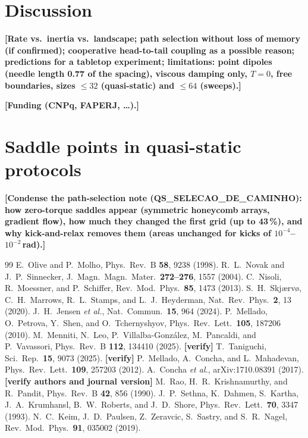 \documentclass[pre,twocolumn,superscriptaddress,showpacs,floatfix]{revtex4-2}
\newcommand{\todo}[1]{\textcolor{red!70!black}{\textbf{[#1]}}}
\begin{document}
\section{Discussion}
\label{sec:discussion}
\todo{Rate vs.\ inertia vs.\ landscape; path selection without loss of memory (if confirmed); cooperative head-to-tail coupling as a possible reason; predictions for a tabletop experiment; limitations: point dipoles (needle length 0.77 of the spacing), viscous damping only, $T=0$, free boundaries, sizes $\le32$ (quasi-static) and $\le64$ (sweeps).}

\begin{acknowledgments}
\todo{Funding (CNPq, FAPERJ, \ldots).}
\end{acknowledgments}

\appendix
\section{Saddle points in quasi-static protocols}
\label{app:saddle}
\todo{Condense the path-selection note (QS\_SELECAO\_DE\_CAMINHO): how zero-torque saddles appear (symmetric honeycomb arrays, gradient flow), how much they changed the first grid (up to 43\,\%), and why kick-and-relax removes them (areas unchanged for kicks of $10^{-4}$--$10^{-2}$\,rad).}

\begin{thebibliography}{99}
 E.~Olive and P.~Molho, Phys.\ Rev.\ B \textbf{58}, 9238 (1998).
 R.~L.~Novak and J.~P.~Sinnecker, J.\ Magn.\ Magn.\ Mater.\ \textbf{272--276}, 1557 (2004).
 C.~Nisoli, R.~Moessner, and P.~Schiffer, Rev.\ Mod.\ Phys.\ \textbf{85}, 1473 (2013).
 S.~H.~Skj\ae rv\o, C.~H.~Marrows, R.~L.~Stamps, and L.~J.~Heyderman, Nat.\ Rev.\ Phys.\ \textbf{2}, 13 (2020).
 J.~H.~Jensen \emph{et al.}, Nat.\ Commun.\ \textbf{15}, 964 (2024).
 P.~Mellado, O.~Petrova, Y.~Shen, and O.~Tchernyshyov, Phys.\ Rev.\ Lett.\ \textbf{105}, 187206 (2010).
 M.~Menniti, N.~Leo, P.~Villalba-Gonz\'alez, M.~Pancaldi, and P.~Vavassori, Phys.\ Rev.\ B \textbf{112}, 134410 (2025). \todo{verify}
 T.~Taniguchi, Sci.\ Rep.\ \textbf{15}, 9073 (2025). \todo{verify}
 P.~Mellado, A.~Concha, and L.~Mahadevan, Phys.\ Rev.\ Lett.\ \textbf{109}, 257203 (2012).
 A.~Concha \emph{et al.}, arXiv:1710.08391 (2017). \todo{verify authors and journal version}
 M.~Rao, H.~R.~Krishnamurthy, and R.~Pandit, Phys.\ Rev.\ B \textbf{42}, 856 (1990).
 J.~P.~Sethna, K.~Dahmen, S.~Kartha, J.~A.~Krumhansl, B.~W.~Roberts, and J.~D.~Shore, Phys.\ Rev.\ Lett.\ \textbf{70}, 3347 (1993).
 N.~C.~Keim, J.~D.~Paulsen, Z.~Zeravcic, S.~Sastry, and S.~R.~Nagel, Rev.\ Mod.\ Phys.\ \textbf{91}, 035002 (2019).
\end{thebibliography}
\end{document}
